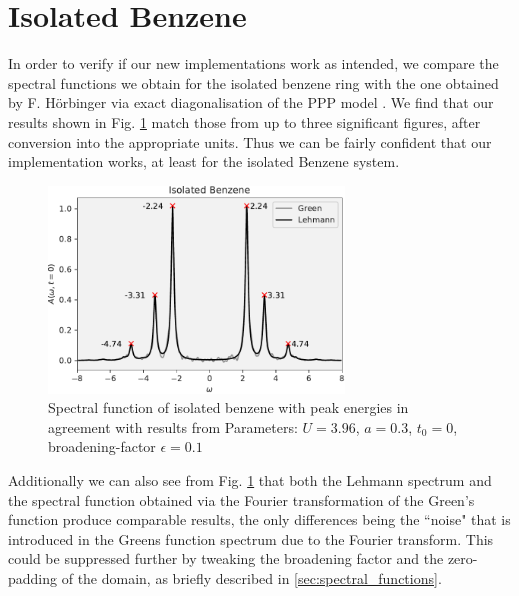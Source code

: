 \section{Isolated Benzene}
    In order to verify if our new implementations work as intended, we compare the spectral functions we obtain for the isolated benzene ring with the one obtained by F. Hörbinger via exact diagonalisation of the PPP model \cite{hoerbinger}. We find that our results shown in Fig. \ref{fig:isolated_benzene} match those from \cite{hoerbinger} up to three significant figures, after conversion into the appropriate units. Thus we can be fairly confident that our implementation works, at least for the isolated Benzene system.

\medskip
\begin{figure}[!hbt]
    \centering
    \includegraphics[width=0.7\textwidth]{graph/isolated_benzene.pdf}
    \caption{Spectral function of isolated benzene with peak energies in agreement with results from \cite{hoerbinger}\newline
    Parameters: $U = 3.96$, $a = 0.3$, $t_0 = 0$, broadening-factor $\epsilon = 0.1 $
    }\label{fig:isolated_benzene}
\end{figure}

Additionally we can also see from Fig. \ref{fig:isolated_benzene} that both the Lehmann spectrum and the spectral function obtained via the Fourier transformation of the Green's function produce comparable results, the only differences being the ``noise" that is introduced in the Greens function spectrum due to the Fourier transform. This could be suppressed further by tweaking the broadening factor and the zero-padding of the domain, as briefly described in \ref{sec:spectral_functions}.